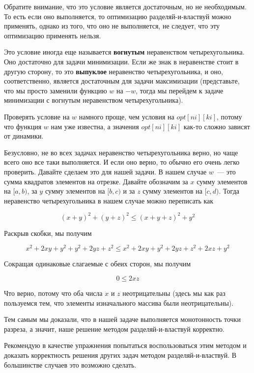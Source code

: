 \begin{observation}
Обратите внимание, что это условие является достаточным, но не необходимым. То есть если оно выполняется, то оптимизацию разделяй-и-властвуй можно применять, однако из того, что оно не выполняется, не следует, что эту оптимизацию применять нельзя.
\end{observation}

\begin{observation}
    Это условие иногда еще называется \textbf{вогнутым} неравенством четырехугольника. Оно достаточно для задачи минимизации. Если же знак в неравенстве стоит в другую сторону, то это \textbf{выпуклое} неравенство четырехугольника, и оно, соответственно, является достаточным для задачи максимизации (представьте, что мы просто заменили функцию $w$ на $-w$, тогда мы перейдем к задаче минимизации с вогнутым неравенством четырехугольника).
\end{observation}

Проверять условие на $w$ намного проще, чем условия на $opt[ni][ki]$, потому что функция $w$ нам уже известна, а значения $opt[ni][ki]$ как-то сложно зависят от динамики.

Безусловно, не во всех задачах неравенство четырехугольника верно, но чаще всего оно все таки выполняется. И если оно верно, то обычно его очень легко проверить. Давайте сделаем это для нашей задачи. В нашем случае $w$~--- это сумма квадратов элементов на отрезке. Давайте обозначим за $x$ сумму элементов на $[a, b)$, за $y$ сумму элементов на $[b, c)$ и за $z$ сумму элементов на $[c, d)$. Тогда неравенство четырехугольника в нашем случае можно переписать как

$$(x + y)^2 + (y + z)^2 \le (x + y + z)^2 + y^2$$

Раскрыв скобки, мы получим

$$x^2 + 2xy + y^2 + y^2 + 2yz + z^2 \le x^2 + 2xy + y^2 + 2yz + z^2 + 2xz + y^2$$

Сокращая одинаковые слагаемые с обеих сторон, мы получим

$$0 \le 2xz$$

Что верно, потому что оба числа $x$ и $z$ неотрицательны (здесь мы как раз пользуемся тем, что элементы изначального массива были неотрицательны).

Тем самым мы доказали, что в нашей задаче выполняется монотонность точки разреза, а значит, наше решение методом разделяй-и-властвуй корректно.

Рекомендую в качестве упражнения попытаться воспользоваться этим методом и доказать корректность решения других задач методом разделяй-и-властвуй. В большинстве случаев это возможно сделать.

